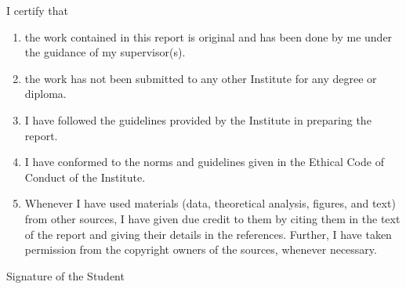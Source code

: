 \begin{center}\end{center}
\vspace{2.2cm}
\noindent I certify that
\vspace{1.6cm}
\begin{enumerate}[label=\alph*.,leftmargin=3.2cm,itemsep=8pt]
\item the work contained in this report is original and has been done by me under the guidance of my supervisor(s).
\item the work has not been submitted to any other Institute for any degree or diploma.
\item I have followed the guidelines provided by the Institute in preparing the report.
\item I have conformed to the norms and guidelines given in the Ethical Code of Conduct of the Institute.
\item Whenever I have used materials (data, theoretical analysis, figures, and text) from other sources, I have given due credit to them by citing them in the text of the report and giving their details in the references. Further, I have taken permission from the copyright owners of the sources, whenever necessary.
\end{enumerate}
\vspace{3.2cm}
\hfill Signature of the Student\hspace{0.2cm}
